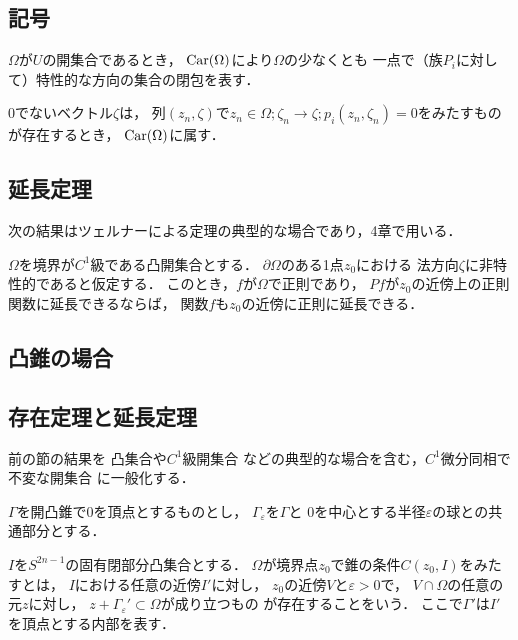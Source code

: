 \subsection{記号}
\begin{DFN}
    \(\Omega\)が\(U\)の開集合であるとき，
    \(\mathop{\mathrm{Car}}\nolimits(\Omega)\)により\(\Omega\)の少なくとも
    一点で（族\(P_i\)に対して）特性的な方向の集合の閉包を表す．
\end{DFN}

0でないベクトル\(\zeta\)は，
列\((z_n,\zeta)\)で\(
    z_n\in\Omega; \zeta_n\to\zeta; 
    p_i(z_n,\zeta_n)=0
\)をみたすものが存在するとき，
\(\mathop{\mathrm{Car}}\nolimits(\Omega)\)に属す．

\subsection{延長定理}

次の結果はツェルナーによる定理の典型的な場合であり，4章で用いる．
\begin{LMM}
    \(\Omega\)を境界が\(C^1\)級である凸開集合とする．
    \(\partial\Omega\)のある1点\(z_0\)における
    法方向\(\zeta\)に非特性的であると仮定する．
    このとき，\(f\)が\(\Omega\)で正則であり，
    \(Pf\)が\(z_0\)の近傍上の正則関数に延長できるならば，
    関数\(f\)も\(z_0\)の近傍に正則に延長できる．
\end{LMM}


\subsection{凸錐の場合}

\subsection{存在定理と延長定理}
前の節の結果を
凸集合や\(C^1\)級開集合
などの典型的な場合を含む，\(C^1\)微分同相で不変な開集合
に一般化する．

\(\Gamma\)を開凸錐で0を頂点とするものとし，
\(\Gamma_\varepsilon\)を\(\Gamma\)と
0を中心とする半径\(\varepsilon\)の球との共通部分とする．

\begin{DFN}
    \(I\)を\(S^{2n-1}\)の固有閉部分凸集合とする．
    \(\Omega\)が境界点\(z_0\)で錐の条件\(C(z_0,I)\)をみたすとは，
    \(I\)における任意の近傍\(I'\)に対し，
    \(z_0\)の近傍\(V\)と\(\varepsilon>0\)で，
    \(V\cap\Omega\)の任意の元\(z\)に対し，
    \(z+\Gamma_\varepsilon'\subset\Omega\)が成り立つもの
    が存在することをいう．
    ここで\(\Gamma'\)は\(I'\)を頂点とする内部を表す．
\end{DFN}



